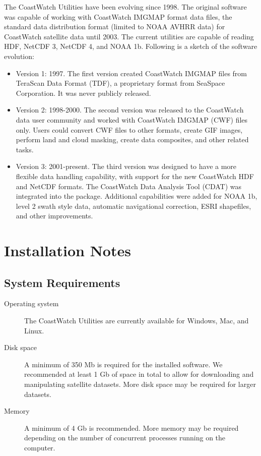 The CoastWatch Utilities have been evolving since 1998.  The original
software was capable of working with CoastWatch IMGMAP format data
files, the standard data distribution format (limited to NOAA AVHRR
data) for CoastWatch satellite data until 2003.  The current utilities
are capable of reading HDF, NetCDF 3, NetCDF 4, and NOAA 1b.  Following
is a sketch of the software evolution:
\begin{itemize}

  \item Version 1: 1997.  The first version created CoastWatch IMGMAP
  files from TeraScan Data Format (TDF), a proprietary format from
  SeaSpace Corporation.  It was never publicly released.

  \item Version 2: 1998-2000.  The second version was released to the
  CoastWatch data user community and worked with CoastWatch IMGMAP
  (CWF) files only.  Users could convert CWF files to other formats,
  create GIF images, perform land and cloud masking, create data
  composites, and other related tasks.  

  \item Version 3: 2001-present.  The third version was designed to have
  a more flexible data handling capability, with support for the new
  CoastWatch HDF and NetCDF formats.  The CoastWatch
  Data Analysis Tool (CDAT) was integrated into the package.
  Additional capabilities were added for NOAA 1b, level 2 swath
  style data, automatic navigational correction, ESRI shapefiles, and
  other improvements.

\end{itemize}

\section{Installation Notes}

\subsection{System Requirements}

\begin{description}

  \item[Operating system] The CoastWatch Utilities are currently
  available for Windows, Mac, and Linux.

  \item[Disk space] A minimum of 350 Mb is required for the installed
  software. We recommended at least 1 Gb of space in total to
  allow for downloading and manipulating satellite datasets. More
  disk space may be required for larger datasets.

  \item[Memory] A minimum of 4 Gb is recommended.  More memory
  may be required depending on the number of concurrent processes
  running on the computer.

\end{description}

